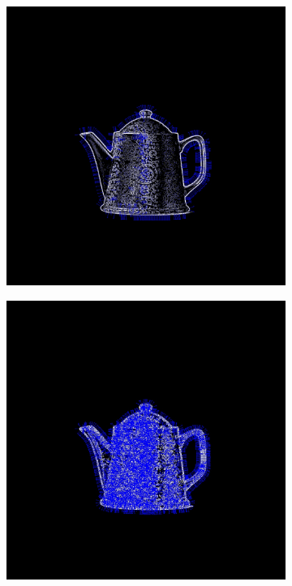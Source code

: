 \documentclass[12pt,a4paper]{report}
\begin{document}
\begin{figure}[!]
    \begin{minipage}{\linewidth}
        \centering
        \begin{subfigure}{0.49\textwidth}
              \includegraphics[width=\linewidth]{output/first_order_gvf.jpg}
        \end{subfigure}
        \begin{subfigure}{0.49\textwidth}
              \includegraphics[width=\linewidth]{output/second_order_gvf.jpg}
        \end{subfigure}


\end{minipage}
\end{figure}
\end{document}
